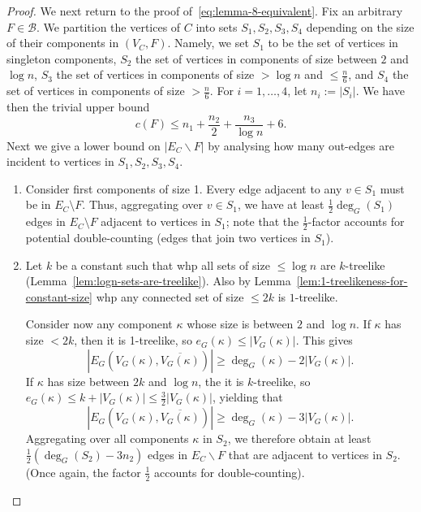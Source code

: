 \documentclass[11pt]{article}
\theoremstyle{plain}
\newcommand{\1}{\mathbb{1}}
\begin{document}
\begin{proof}
We next return to the proof of~\eqref{eq:lemma-8-equivalent}. Fix an arbitrary $F\in \mathcal{B}$. We partition the vertices of \(C\) into sets $S_1,S_2,S_3,S_4$ depending on the size of their components in \((V_C,F)\). Namely, we set $S_1$ to be the set of vertices in singleton components, $S_2$  the set of vertices in components of size between \(2\) and \(\log n\), $S_3$ the set of vertices in components of size \(> \log n\) and \(\leq \tfrac{n}{6}\), and $S_4$  the set of vertices in components of size \(>\tfrac n6\).   For \(i = 1,\dots,4\), let \(n_i := |S_i|\). We have then the trivial upper bound 
    \begin{equation}\label{eq:rvrtvta}
        c(F)\leq n_1 + \frac{n_2}{2} + \frac{n_3}{\log n} + 6.
    \end{equation}
Next we give a lower bound on $|E_C\backslash F|$ by analysing how many out-edges are incident to vertices in $S_1,S_2,S_3,S_4$. 
    \begin{enumerate}
        \item Consider first components of size 1. Every edge adjacent to any $v\in S_1$ must be in \(E_C\setminus F\). Thus, aggregating over $v\in S_1$, we have at least  \(\tfrac{1}{2}\deg_G(S_1)\) edges in \(E_C\setminus F\) adjacent to vertices in $S_1$; note that the $\tfrac{1}{2}$-factor accounts for potential double-counting (edges that join two vertices in $S_1$).

        \item Let \(k\) be a constant such that whp all sets of size \(\leq \log n\) are \(k\)-treelike (Lemma~\ref{lem:logn-sets-are-treelike}). Also by Lemma~\ref{lem:1-treelikeness-for-constant-size}  whp any connected set of size \(\leq 2k\) is \(1\)-treelike.

        Consider now any component $\kappa$ whose size is between $2$ and $\log n$. If $\kappa$ has size \(<2k\), then it is 1-treelike, so \(e_G(\kappa)\leq |V_G(\kappa)|\). This gives
        \[|E_G(V_G(\kappa),\overline{V_G(\kappa)})|\geq \deg_G(\kappa) - 2|V_G(\kappa)|.\]
        If \(\kappa\) has size between \(2k\) and \(\log n\),  the it is $k$-treelike, so \(e_G(\kappa) \leq k + |V_G(\kappa)| \leq \tfrac32|V_G(\kappa)|\), yielding that       
        \[|E_G(V_G(\kappa),\overline{V_G(\kappa)})| \geq \deg_G(\kappa) - 3|V_G(\kappa)|.\] 
        Aggregating over all components $\kappa$ in $S_2$, we therefore obtain at least $\tfrac{1}{2}(\deg_G(S_2)-3n_2)$ edges in $E_C\backslash F$ that are adjacent to vertices in $S_2$. (Once again, the factor $\tfrac{1}{2}$ accounts for double-counting).
        

\end{enumerate}
\end{proof}
\end{document}
